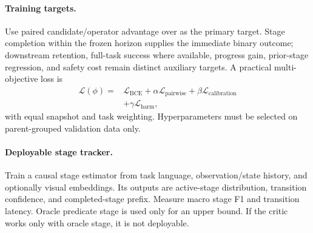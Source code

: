 \paragraph{Training targets.}
Use paired candidate/operator advantage over  as the primary target. Stage completion within the frozen horizon supplies the immediate binary outcome; downstream retention, full-task success where available, progress gain, prior-stage regression, and safety cost remain distinct auxiliary targets. A practical multi-objective loss is
\begin{equation}
\begin{split}
  \mathcal{L}(\phi)
  ={}& \mathcal{L}_{\mathrm{BCE}}
  +\alpha\mathcal{L}_{\mathrm{pairwise}}
  +\beta\mathcal{L}_{\mathrm{calibration}}\\
  &+\gamma\mathcal{L}_{\mathrm{harm}},
\end{split}
\label{eq:critic-loss}
\end{equation}
with equal snapshot and task weighting. Hyperparameters must be selected on parent-grouped validation data only.

\paragraph{Deployable stage tracker.}
Train a causal stage estimator from task language, observation/state history, and optionally visual embeddings. Its outputs are active-stage distribution, transition confidence, and completed-stage prefix. Measure macro stage F1 and transition latency. Oracle predicate stage is used only for an upper bound. If the critic works only with oracle stage, it is not deployable.



